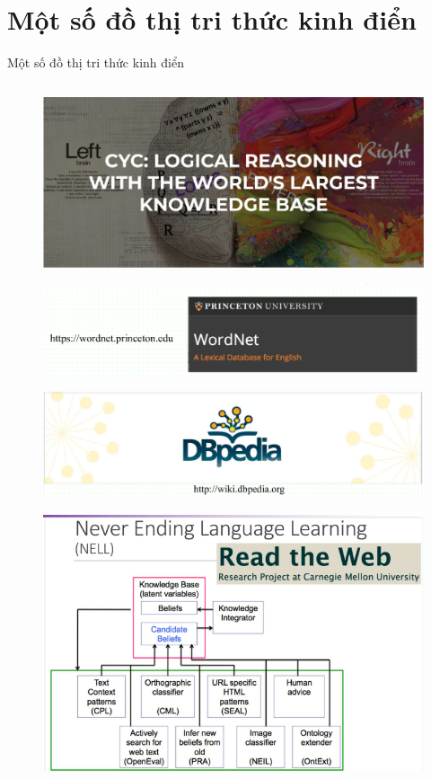 \documentclass[notheorems, aspectratio=54]{beamer}
\begin{document}
	\section{Một số đồ thị tri thức kinh điển}
	\begin{frame}{Một số đồ thị tri thức kinh điển}
		\begin{columns}
			\begin{column}{0.5\textwidth}
				\begin{figure}[H]
					\includegraphics[width=0.5\linewidth]{figs/cyc.png}
					\label{fig:writing-thesis}
				\end{figure}
				\begin{figure}[H]
					\includegraphics[width=0.5\linewidth]{figs/wordnet.png}
					\label{fig:writing-thesis}
				\end{figure}
				\begin{figure}[H]
					\includegraphics[width=0.5\linewidth]{figs/dbpedia.png}
					\label{fig:writing-thesis}
				\end{figure}
				\begin{figure}[H]
					\includegraphics[width=1\linewidth]{figs/nell.png}

\end{figure}
\end{column}
\end{columns}
\end{frame}
\end{document}
